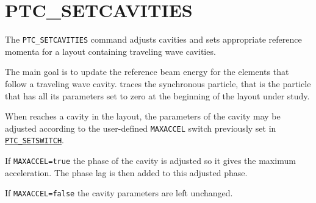  


\section{PTC\_SETCAVITIES}
\label{sec:ptc_setcavities}

The {\tt PTC\_SETCAVITIES} command adjusts cavities and sets appropriate
reference momenta for a layout containing traveling wave cavities. 


The main goal is to update the reference beam energy for the elements that
follow a traveling wave cavity. \ptc traces the synchronous particle,
that is the particle that has all its parameters set to zero at the
beginning of the layout under study. 

When \ptc reaches a cavity in the layout, the parameters of the cavity
may be adjusted according to the user-defined {\tt MAXACCEL} switch
previously set in \hyperref[sec:ptc_setswitch]{\tt PTC\_SETSWITCH}.

If {\tt MAXACCEL=true} the phase of the cavity is adjusted so it gives
the maximum acceleration. The phase lag is then added to this adjusted
phase.

If {\tt MAXACCEL=false} the cavity parameters are left unchanged. 


